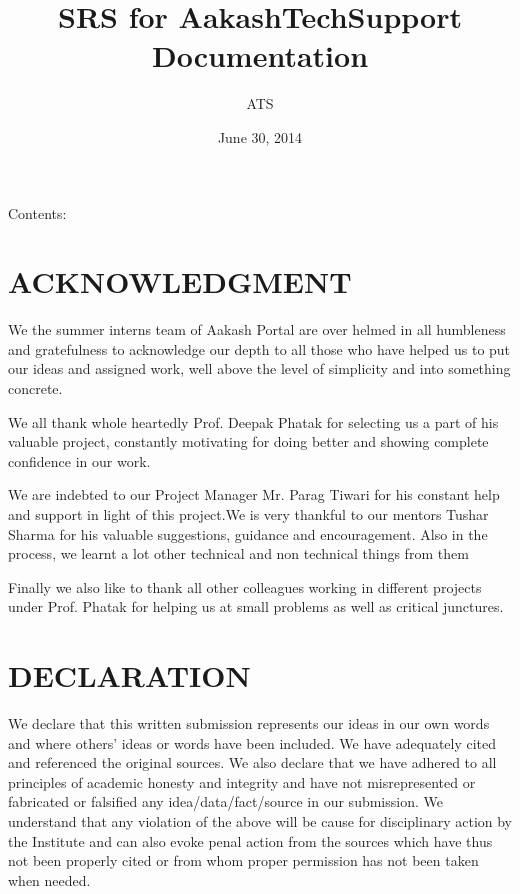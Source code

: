 \documentclass[letterpaper,10pt,english]{sphinxmanual}
\title{SRS for AakashTechSupport Documentation}
\date{June 30, 2014}
\author{ATS}
\begin{document}
\maketitle
\tableofcontents
{}\label{index::doc}


Contents:


\chapter{ACKNOWLEDGMENT}
\label{acknowledgement::doc}\label{acknowledgement:acknowledgment}\label{acknowledgement:welcome-to-srs-for-aakashtechsupport-s-documentation}
We the summer interns team of Aakash Portal are over helmed in all humbleness and gratefulness to acknowledge our depth to all those who have helped us to put our ideas and assigned work, well above the level of simplicity and into something concrete.

We all thank whole heartedly Prof. Deepak Phatak for selecting us a part of his valuable project, constantly motivating for doing better and showing complete confidence in our work.

We are indebted to our Project Manager Mr. Parag Tiwari for his constant help and support in light of this project.We is very thankful to our mentors Tushar Sharma for his valuable suggestions, guidance and encouragement. Also in the process, we learnt a lot other technical and non technical things from them

Finally we also like to thank all other colleagues working in different projects under Prof. Phatak for helping us at small problems as well as critical junctures.


\chapter{DECLARATION}
\label{declaration::doc}\label{declaration:declaration}
We declare that this written submission represents our ideas in our own words and where others' ideas or words have been included. We have adequately cited and referenced the original sources. We also declare that we have adhered to all principles of academic honesty and integrity and have not misrepresented or fabricated or falsified any idea/data/fact/source in our submission. We understand that any violation of the above will be cause for disciplinary action by the Institute and can also evoke penal action from the sources which have thus not been properly cited or from whom proper permission has not been taken when needed.
\end{document}
